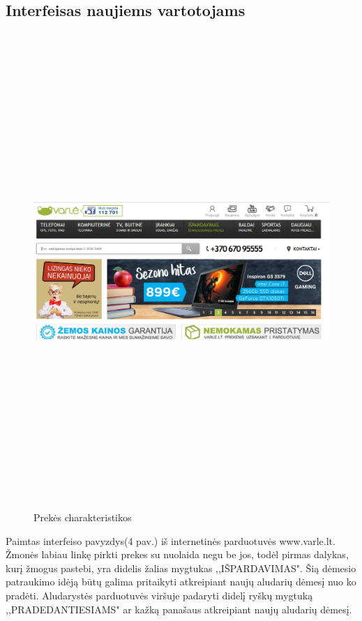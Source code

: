 \documentclass[oneside]{VUMIFPSkursinis}
\begin{document}
	\subsection{Interfeisas naujiems vartotojams}
		\begin{figure}[h]
			\centering
			\includegraphics[width=15cm,height=18cm,keepaspectratio]{IkvepiantisInterfeisas4.png}
			\caption{ Prekės charakteristikos}
		\end{figure}
	
			Paimtas interfeiso pavyzdys(4 pav.) iš internetinės parduotuvės www.varle.lt. 
			Žmonės labiau linkę pirkti prekes su nuolaida negu be jos, todėl pirmas dalykas, kurį žmogus pastebi, yra didelis žalias mygtukas ,,IŠPARDAVIMAS". 
			Šią dėmesio patraukimo idėją būtų galima pritaikyti atkreipiant naujų aludarių dėmesį nuo ko pradėti. 
			Aludarystės parduotuvės viršuje padaryti didelį ryškų mygtuką ,,PRADEDANTIESIAMS" ar kažką panašaus atkreipiant naujų aludarių dėmesį.
\end{document}
